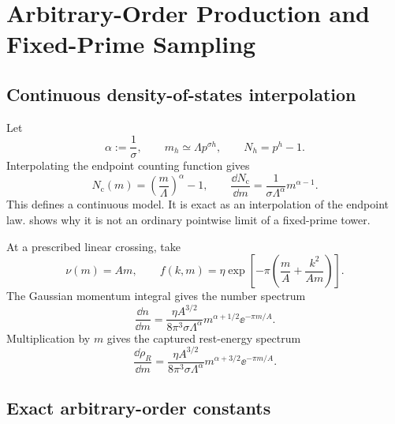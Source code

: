 \chapter{Arbitrary-Order Production and Fixed-Prime Sampling}
\label{ch:universality}

\section{Continuous density-of-states interpolation}

Let
\begin{equation}
\alpha:=\frac1\sigma,
\qquad
m_h\simeq\Lambda p^{\sigma h},
\qquad
N_h=p^h-1.
\label{eq:univ-alpha}
\end{equation}
Interpolating the endpoint counting function gives
\begin{equation}
N_{\mathrm c}(m)=\left(\frac m\Lambda\right)^\alpha-1,
\qquad
\frac{\dd N_{\mathrm c}}{\dd m}
=\frac1{\sigma\Lambda^\alpha}m^{\alpha-1}.
\label{eq:univ-cont-count}
\end{equation}
This defines a continuous model.  It is exact as an interpolation of the endpoint law.   shows why it is not an ordinary pointwise limit of a fixed-prime tower.

At a prescribed linear crossing, take
\begin{equation}
\nu(m)=Am,
\qquad
f(k,m)=\eta\exp\left[-\pi\left(\frac mA+\frac{k^2}{Am}\right)\right].
\label{eq:univ-distribution}
\end{equation}
The Gaussian momentum integral gives the number spectrum
\begin{equation}
\boxed{
\frac{\dd n}{\dd m}
=\frac{\eta A^{3/2}}
{8\pi^3\sigma\Lambda^\alpha}
m^{\alpha+1/2}\ee^{-\pi m/A}.}
\label{eq:univ-number-spectrum}
\end{equation}
Multiplication by $m$ gives the captured rest-energy spectrum
\begin{equation}
\boxed{
\frac{\dd\rho_R}{\dd m}
=\frac{\eta A^{3/2}}
{8\pi^3\sigma\Lambda^\alpha}
m^{\alpha+3/2}\ee^{-\pi m/A}.}
\label{eq:univ-rest-spectrum}
\end{equation}

\section{Exact arbitrary-order constants}


